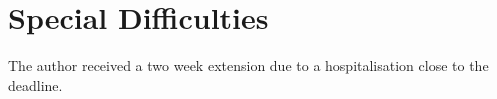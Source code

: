 \section*{Special Difficulties}

The author received a two week extension due to a hospitalisation close to the deadline.

\cleardoublepage

\tableofcontents

\newpage




\cleardoublepage
\setcounter{page}{1}

